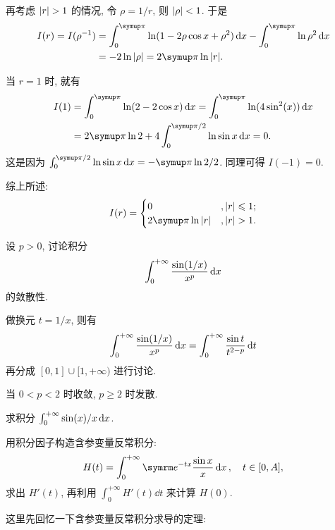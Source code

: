 \begin{exercise}[series=exer]
\begin{answer}
    再考虑 $ \abs{r} > 1 $ 的情况, 令 $ \rho = 1/r $, 则 $ \abs{\rho} < 1 $. 于是
    \begin{align*}
      I(r) = I(\rho^{-1}) & = \int_{0}^{\pi} \ln(1 - 2\rho \cos x + \rho^{2}) \dx* - \int_{0}^{\pi} \ln \rho^{2} \dx* \\
      & =  -2 \ln \abs{\rho} = 2\pi \ln \abs{r}.
    \end{align*}

    当 $ r = 1 $ 时, 就有
    \begin{align*}
      I(1) & = \int_{0}^{\pi} \ln(2 - 2\cos x) \dx* = \int_{0}^{\pi}  \ln(4\sin^{2}(x)) \dx* \\
      & = 2\pi \ln 2 + 4\int_{0}^{\pi/2} \ln \sin x \dx* = 0.
    \end{align*}
    这是因为 $ \int_{0}^{\pi/2} \ln \sin x \dx* = -\pi\ln 2/2 $. 同理可得 $ I(-1) = 0 $.

    综上所述:
    \begin{align*}
        I(r) = \begin{cases}
            0 & , \abs{r} \le 1;\\
            2\pi \ln \abs{r} & , \abs{r} > 1.
        \end{cases}
    \end{align*}
  \end{answer}
  \item 设 $ p > 0 $, 讨论积分
  \begin{align*}
      \int_{0}^{+\infty} \frac{\sin(1/x)}{x^{p}} \dx*
  \end{align*}
  的敛散性.
  \begin{hint}
      做换元 $ t = 1/x $, 则有
      \begin{align*}
          \int_{0}^{+\infty} \frac{\sin(1/x)}{x^{p}} \dx* = \int_{0}^{+\infty} \frac{\sin t}{t^{2 - p}} \dd{t}
      \end{align*}
      再分成 $ [0, 1]\cup[1, +\infty) $ 进行讨论.
  \end{hint}
  \begin{answer}
      当 $ 0 < p < 2 $ 时收敛, $ p \ge 2 $ 时发散.
  \end{answer}
  \item 求积分 $ \int_{0}^{+\infty} \sin(x)/x \dx* $.
  \begin{hint}
      用积分因子构造含参变量反常积分:
      \begin{align*}
          H(t) = \int_{0}^{+\infty} \me^{-tx}\frac{\sin x}{x} \dx*, \quad t\in [0, A],
      \end{align*}
      求出 $ H'(t) $, 再利用 $ \int_{0}^{+\infty}H'(t)\dd{t} $ 来计算 $ H(0) $.
  \end{hint}
  \begin{answer}
      这里先回忆一下含参变量反常积分求导的定理:


\end{answer}
\end{exercise}
